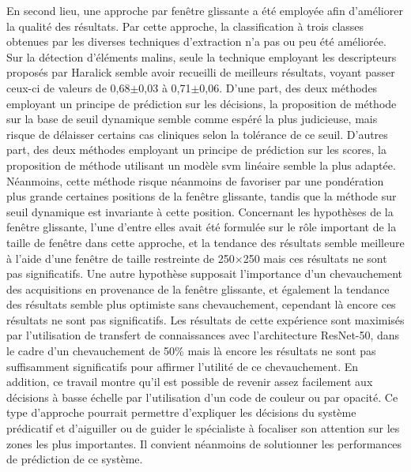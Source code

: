 En second lieu, une approche par fenêtre glissante a été employée afin d'améliorer la qualité des résultats. Par cette approche, la classification à trois classes obtenues par les diverses techniques d'extraction n'a pas ou peu été améliorée. Sur la détection d'éléments malins, seule la technique employant les descripteurs proposés par Haralick semble avoir recueilli de meilleurs résultats, voyant passer ceux-ci de valeurs de \fscore{} 0,68$\pm$0,03 à 0,71$\pm$0,06. D'une part, des deux méthodes employant un principe de prédiction sur les décisions, la proposition de méthode sur la base de seuil dynamique semble comme espéré la plus judicieuse, mais risque de délaisser certains cas cliniques selon la tolérance de ce seuil. D'autres part, des deux méthodes employant un principe de prédiction sur les scores, la proposition de méthode utilisant un modèle \gls{svm} linéaire semble la plus adaptée. Néanmoins, cette méthode risque néanmoins de favoriser par une pondération plus grande certaines positions de la fenêtre glissante, tandis que la méthode sur seuil dynamique est invariante à cette position. Concernant les hypothèses de la fenêtre glissante, l'une d'entre elles avait été formulée sur le rôle important de la taille de fenêtre dans cette approche, et la tendance des résultats semble meilleure à l'aide d’une fenêtre de taille restreinte de 250$\times$250 mais ces résultats ne sont pas significatifs. Une autre hypothèse supposait l'importance d'un chevauchement des acquisitions en provenance de la fenêtre glissante, et également la tendance des résultats semble plus optimiste sans chevauchement, cependant là encore ces résultats ne sont pas significatifs. Les résultats de cette expérience sont maximisés par l'utilisation de transfert de connaissances avec l'architecture ResNet-50, dans le cadre d'un chevauchement de 50\% mais là encore les résultats ne sont pas suffisamment significatifs pour affirmer l'utilité de ce chevauchement. En addition, ce travail montre qu'il est possible de revenir assez facilement aux décisions à basse échelle par l'utilisation d'un code de couleur ou par opacité. Ce type d'approche pourrait permettre d'expliquer les décisions du système prédicatif et d'aiguiller ou de guider le spécialiste à focaliser son attention sur les zones les plus importantes. Il convient néanmoins de solutionner les performances de prédiction de ce système.\par 

